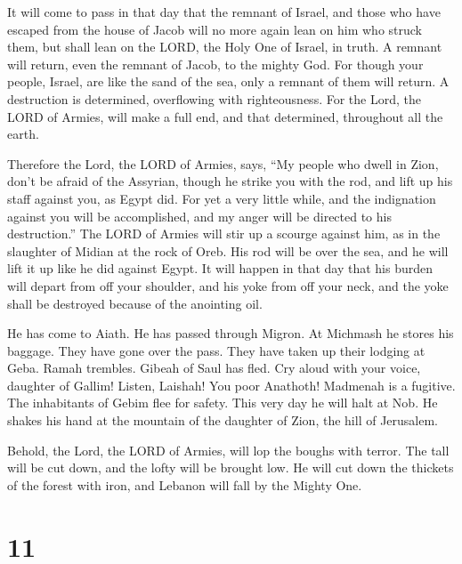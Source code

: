  It will come to pass in that day that the remnant of
Israel, and those who have escaped from the house of Jacob will no more
again lean on him who struck them, but shall lean on the LORD, the Holy
One of Israel, in truth.  A remnant will return, even the
remnant of Jacob, to the mighty God.  For though your
people, Israel, are like the sand of the sea, only a remnant of them
will return. A destruction is determined, overflowing with
righteousness.  For the Lord, the LORD of Armies, will
make a full end, and that determined, throughout all the earth.

 Therefore the Lord, the LORD of Armies, says, ``My
people who dwell in Zion, don't be afraid of the Assyrian, though he
strike you with the rod, and lift up his staff against you, as Egypt
did.  For yet a very little while, and the indignation
against you will be accomplished, and my anger will be directed to his
destruction.''  The LORD of Armies will stir up a scourge
against him, as in the slaughter of Midian at the rock of Oreb. His rod
will be over the sea, and he will lift it up like he did against Egypt.
 It will happen in that day that his burden will depart
from off your shoulder, and his yoke from off your neck, and the yoke
shall be destroyed because of the anointing oil.

 He has come to Aiath. He has passed through Migron. At
Michmash he stores his baggage.  They have gone over the
pass. They have taken up their lodging at Geba. Ramah trembles. Gibeah
of Saul has fled.  Cry aloud with your voice, daughter of
Gallim! Listen, Laishah! You poor Anathoth!  Madmenah is
a fugitive. The inhabitants of Gebim flee for safety. 
This very day he will halt at Nob. He shakes his hand at the mountain of
the daughter of Zion, the hill of Jerusalem.

 Behold, the Lord, the LORD of Armies, will lop the
boughs with terror. The tall will be cut down, and the lofty will be
brought low.  He will cut down the thickets of the forest
with iron, and Lebanon will fall by the Mighty One.

\hypertarget{section-10}{%
\section{11}\label{section-10}}


